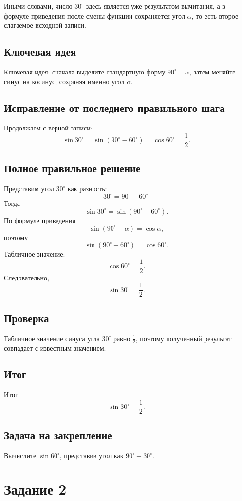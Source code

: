 \documentclass[12pt,a4paper]{article}
\begin{document}
Иными словами, число $30^\circ$ здесь является уже результатом вычитания, а в формуле приведения после смены функции сохраняется угол $\alpha$, то есть второе слагаемое исходной записи.

\subsection*{Ключевая идея}
\textcolor{blue!60!black}{Ключевая идея:} сначала выделите стандартную форму $90^\circ-\alpha$, затем меняйте синус на косинус, сохраняя именно угол $\alpha$.

\subsection*{Исправление от последнего правильного шага}
Продолжаем с верной записи:
\[
\sin 30^\circ
=\sin(90^\circ-60^\circ)
=\cos 60^\circ
=\frac12.
\]

\subsection*{Полное правильное решение}
Представим угол $30^\circ$ как разность:
\[
30^\circ=90^\circ-60^\circ.
\]
Тогда
\[
\sin 30^\circ=\sin(90^\circ-60^\circ).
\]
По формуле приведения
\[
\sin(90^\circ-\alpha)=\cos\alpha,
\]
поэтому
\[
\sin(90^\circ-60^\circ)=\cos60^\circ.
\]
Табличное значение:
\[
\cos60^\circ=\frac12.
\]
Следовательно,
\[
\boxed{\sin30^\circ=\frac12}.
\]

\subsection*{Проверка}
Табличное значение синуса угла $30^\circ$ равно $\frac12$, поэтому полученный результат совпадает с известным значением.

\subsection*{Итог}
\textcolor{teal!60!black}{Итог:}
\[
\sin30^\circ=\frac12.
\]

\subsection*{Задача на закрепление}
Вычислите $\sin60^\circ$, представив угол как $90^\circ-30^\circ$.

\newpage
{}\label{task:2}
\section*{Задание 2}
\end{document}
